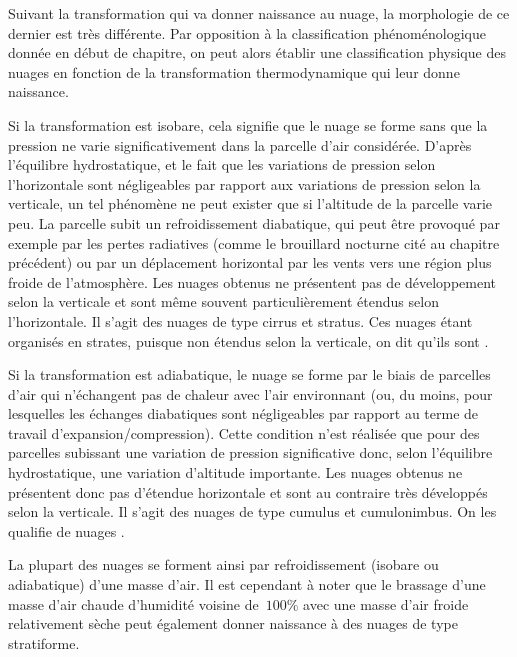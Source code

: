 \sk
Suivant la transformation qui va donner naissance au nuage, la morphologie de ce dernier est très différente. Par opposition à la classification phénoménologique donnée en début de chapitre, on peut alors établir une classification physique des nuages en fonction de la transformation thermodynamique qui leur donne naissance.
\begin{finger}
\item Si la transformation est isobare, cela signifie que le nuage se forme sans que la pression ne varie significativement dans la parcelle d'air considérée. D'après l'équilibre hydrostatique, et le fait que les variations de pression selon l'horizontale sont négligeables par rapport aux variations de pression selon la verticale, un tel phénomène ne peut exister que si l'altitude de la parcelle varie peu. La parcelle subit un refroidissement diabatique, qui peut être provoqué par exemple par les pertes radiatives (comme le brouillard nocturne cité au chapitre précédent) ou par un déplacement horizontal par les vents vers une région plus froide de l'atmosphère. Les nuages obtenus ne présentent pas de développement selon la verticale et sont même souvent particulièrement étendus selon l'horizontale. Il s'agit des nuages de type cirrus et stratus. Ces nuages étant organisés en strates, puisque non étendus selon la verticale, on dit qu'ils sont .
\item Si la transformation est adiabatique, le nuage se forme par le biais de parcelles d'air qui n'échangent pas de chaleur avec l'air environnant (ou, du moins, pour lesquelles les échanges diabatiques sont négligeables par rapport au terme de travail d'expansion/compression). Cette condition n'est réalisée que pour des parcelles subissant une variation de pression significative donc, selon l'équilibre hydrostatique, une variation d'altitude importante. Les nuages obtenus ne présentent donc pas d'étendue horizontale et sont au contraire très développés selon la verticale. Il s'agit des nuages de type cumulus et cumulonimbus. On les qualifie de nuages .
\end{finger}

\sk
La plupart des nuages se forment ainsi par refroidissement (isobare ou adiabatique) d'une masse d'air. Il est cependant à noter que le brassage d'une masse d'air chaude d'humidité voisine de~$100\%$ avec une masse d'air froide relativement sèche peut également donner naissance à des nuages de type stratiforme. %

